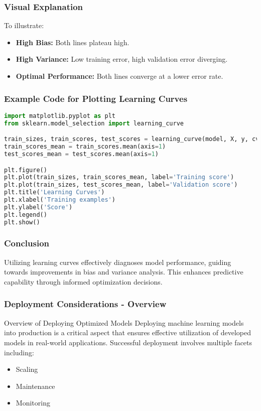 \documentclass[aspectratio=169]{beamer}
\begin{document}
\begin{frame}
    \frametitle{Visual Explanation}
    To illustrate:
    \begin{itemize}
        \item \textbf{High Bias:} Both lines plateau high.
        \item \textbf{High Variance:} Low training error, high validation error diverging.
        \item \textbf{Optimal Performance:} Both lines converge at a lower error rate.
    \end{itemize}
\end{frame}

\begin{frame}[fragile]
    \frametitle{Example Code for Plotting Learning Curves}
    \begin{lstlisting}[language=Python]
import matplotlib.pyplot as plt
from sklearn.model_selection import learning_curve

train_sizes, train_scores, test_scores = learning_curve(model, X, y, cv=5)
train_scores_mean = train_scores.mean(axis=1)
test_scores_mean = test_scores.mean(axis=1)

plt.figure()
plt.plot(train_sizes, train_scores_mean, label='Training score')
plt.plot(train_sizes, test_scores_mean, label='Validation score')
plt.title('Learning Curves')
plt.xlabel('Training examples')
plt.ylabel('Score')
plt.legend()
plt.show()
    \end{lstlisting}
\end{frame}

\begin{frame}
    \frametitle{Conclusion}
    Utilizing learning curves effectively diagnoses model performance, guiding towards improvements in bias and variance analysis. This enhances predictive capability through informed optimization decisions.
\end{frame}

\begin{frame}[fragile]
    \frametitle{Deployment Considerations - Overview}
    \begin{block}{Overview of Deploying Optimized Models}
        Deploying machine learning models into production is a critical aspect that ensures effective utilization of developed models in real-world applications. Successful deployment involves multiple facets including:
        \begin{itemize}
            \item Scaling
            \item Maintenance
            \item Monitoring
        \end{itemize}
    \end{block}
\end{frame}
\end{document}
